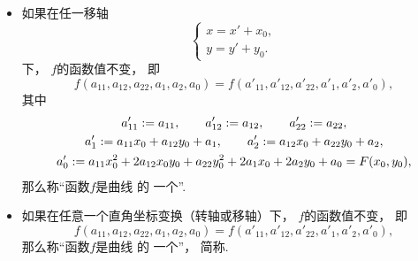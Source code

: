 \begin{definition}
\begin{itemize}
	\item 如果在任一移轴\begin{equation*}
		\left\{ \begin{array}{l}
			x = x' + x_0, \\
			y = y' + y_0.
		\end{array} \right.
	\end{equation*}下，
	\(f\)的函数值不变，
	即\begin{equation*}
		f(a_{11},a_{12},a_{22},a_1,a_2,a_0)
		= f(a'_{11},a'_{12},a'_{22},a'_1,a'_2,a'_0),
	\end{equation*}
	其中\begin{gather*}
		a'_{11} := a_{11},
		\qquad
		a'_{12} := a_{12},
		\qquad
		a'_{22} := a_{22}, \\
		a'_1 := a_{11} x_0 + a_{12} y_0 + a_1,
		\qquad
		a'_2 := a_{12} x_0 + a_{22} y_0 + a_2, \\
		a'_0 := a_{11} x_0^2
			+ 2 a_{12} x_0 y_0
			+ a_{22} y_0^2
			+ 2 a_1 x_0
			+ 2 a_2 y_0
			+ a_0
			= F(x_0,y_0),
	\end{gather*}
	那么称“函数\(f\)是曲线  的
	一个”.

	\item 如果在任意一个直角坐标变换（转轴或移轴）下，
	\(f\)的函数值不变，
	即\begin{equation*}
		f(a_{11},a_{12},a_{22},a_1,a_2,a_0)
		= f(a'_{11},a'_{12},a'_{22},a'_1,a'_2,a'_0),
	\end{equation*}
	那么称“函数\(f\)是曲线  的
	一个”，
	简称.


\end{itemize}
\end{definition}
